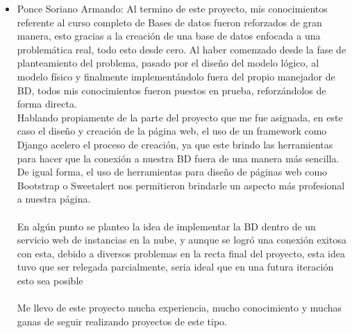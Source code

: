 \documentclass[12pt,letterpaper]{article}
\begin{document}
\begin{itemize}
		
		\item Ponce Soriano Armando:
		\subitem Al termino de este proyecto, mis conocimientos referente al curso completo de Bases de datos fueron reforzados de gran manera, esto gracias a la creación de una base de datos enfocada a una problemática real, todo esto desde cero. Al haber comenzado desde la fase de planteamiento del problema, pasado por el diseño del modelo lógico, al modelo físico y finalmente implementándolo fuera del propio manejador de BD, todos mis conocimientos fueron puestos en prueba, reforzándolos de forma directa.
		\\Hablando propiamente de la parte del proyecto que me fue asignada, en este caso el diseño y  creación de la página web, el uso de un framework como Django acelero el proceso de creación, ya que este brindo las herramientas para hacer que la conexión a nuestra BD fuera de una manera más sencilla.  De igual forma,  el uso de herramientas para diseño de páginas web como Bootstrap o Sweetalert nos permitieron brindarle un aspecto más profesional a nuestra página.\\ 
		\\En algún punto se planteo la idea de implementar la BD dentro de un servicio web de instancias en la nube, y aunque se logró una conexión exitosa con esta, debido a diversos problemas en la recta final del proyecto, esta idea tuvo que ser relegada parcialmente, seria ideal que en una futura iteración esto sea posible\\
		\\Me llevo de este proyecto mucha experiencia, mucho conocimiento y muchas ganas de seguir realizando proyectos de este tipo.\\
		
	\end{itemize}
	
\end{document}

